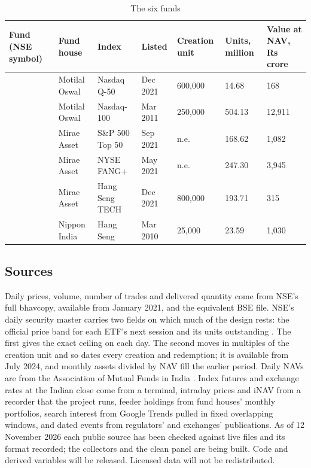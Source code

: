 \begin{table}[!t]
\centering\footnotesize
\caption{The six funds}\label{tab:funds}
\begin{tabularx}{\textwidth}{L{2.25cm}L{2.1cm}YR{1.5cm}R{1.45cm}R{1.5cm}R{1.6cm}}
\toprule
Fund (NSE symbol) & Fund house & Index & Listed & Creation unit & Units, million & Value at NAV, Rs crore\\
\midrule
{} & Motilal Oswal & Nasdaq Q-50 & Dec 2021 & 600,000 & 14.68 & 168\\
 & Motilal Oswal & Nasdaq-100 & Mar 2011 & 250,000 & 504.13 & 12,911\\
 & Mirae Asset & S\&P 500 Top 50 & Sep 2021 & n.e. & 168.62 & 1,082\\
 & Mirae Asset & NYSE FANG+ & May 2021 & n.e. & 247.30 & 3,945\\
 & Mirae Asset & Hang Seng TECH & Dec 2021 & 800,000 & 193.71 & 315\\
 & Nippon India & Hang Seng & Mar 2010 & 25,000 & 23.59 & 1,030\\
\bottomrule
\end{tabularx}
\end{table}

\subsection{Sources}
Daily prices, volume, number of trades and delivered quantity come from NSE's full bhavcopy, available from January 2021, and the equivalent BSE file. NSE's daily security master carries two fields on which much of the design rests: the official price band for each ETF's next session and its units outstanding \citep{nse2026files}. The first gives the exact ceiling on each day. The second moves in multiples of the creation unit and so dates every creation and redemption; it is available from July 2024, and monthly assets divided by NAV fill the earlier period. Daily NAVs are from the Association of Mutual Funds in India \citep{amfi2026nav}. Index futures and exchange rates at the Indian close come from a terminal, intraday prices and iNAV from a recorder that the project runs, feeder holdings from fund houses' monthly portfolios, search interest from Google Trends pulled in fixed overlapping windows, and dated events from regulators' and exchanges' publications. As of 12 November 2026 each public source has been checked against live files and its format recorded; the collectors and the clean panel are being built. Code and derived variables will be released. Licensed data will not be redistributed.

